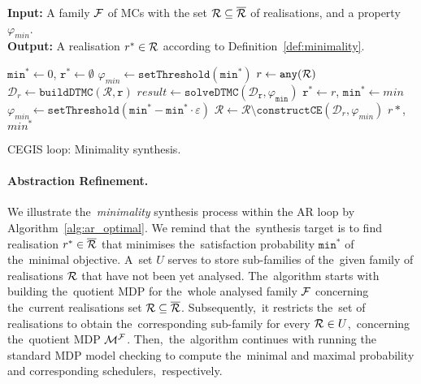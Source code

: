\begin{algorithm}[h!]
\hspace*{\algorithmicindent} \textbf{Input:} A family $\mathcal{F}$ of MCs with the set $\mathcal{R} \subseteq \overline{\mathcal{R}}$ of realisations, and a property $\varphi_{min}$. \\
\hspace*{\algorithmicindent} \textbf{Output:}  A realisation $r^* \in \mathcal{R}$ according to Definition~\ref{def:minimality}. \\
\vspace*{-1.5em}
\begin{algorithmic}[1]
    \STATE $\mathtt{min^*} \leftarrow 0$, $\mathtt{r^*} \leftarrow \emptyset$
    \STATE $\varphi_{min} \leftarrow \mathtt{setThreshold(min^*)}$
    \WHILE{$\rlz \neq \emptyset$}
        \STATE $r \leftarrow \mathtt{any(\mathcal{R})}$
        \STATE $\mathcal{D}_r\leftarrow \mathtt{buildDTMC(\mathcal{R}, r)}$
        \STATE $result \leftarrow \mathtt{solveDTMC(\mathcal{D}_r, \varphi_{min})}$
            \STATE $\mathtt{r^*} \leftarrow r$, $\mathtt{min^*} \leftarrow min$
            \STATE $\varphi_{min} \leftarrow \mathtt{setThreshold(min^* - min^* \cdot \varepsilon)}$
        \ELSE
            \STATE $\mathcal{R} \leftarrow \mathcal{R} \setminus \mathtt{constructCE}(\mathcal{D}_r, \varphi_{min})$
        \ENDIF
    \ENDWHILE
    \RETURN $r*$, $min^*$
\end{algorithmic}
\caption{CEGIS loop: Minimality synthesis.}
\label{alg:cegis_optimal}
\end{algorithm}

\paragraph{Abstraction Refinement.}
We illustrate the~\textit{minimality} synthesis process within the AR loop by Algorithm~\ref{alg:ar_optimal}.
We remind that the~synthesis target is to find realisation $r^* \in \overline{\mathcal{R}}$ that minimises the~satisfaction probability $\mathtt{min^*}$ of the~minimal objective.
A~set $U$ serves to store sub-families of the~given family of realisations $\mathcal{R}$ that have not been yet analysed.
The~algorithm starts with building the~quotient MDP for the~whole analysed family $\mathcal{F}$ concerning the~current realisations set $\mathcal{R} \subseteq \overline{\mathcal{R}}$.
Subsequently,~it restricts the~set of realisations to obtain the~corresponding sub-family for every $\mathcal{R} \in U$,~concerning the~quotient MDP $\mathcal{M}^{\mathcal{F}}$. 
Then,~the~algorithm continues with running the standard MDP model checking to compute the~minimal and maximal probability and corresponding schedulers,~respectively.

